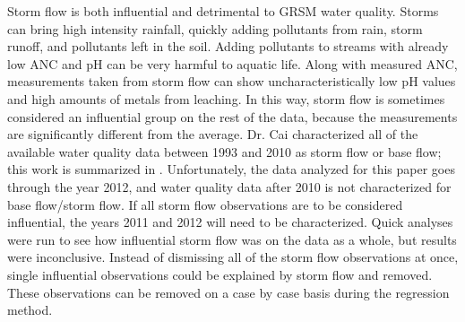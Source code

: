 Storm flow is both influential and detrimental  to GRSM water quality. 
Storms can bring high intensity rainfall, quickly adding pollutants from rain, storm runoff, and pollutants left in the soil.
Adding pollutants to streams with already low ANC and pH can be very harmful to aquatic life.
Along with measured ANC, measurements taken from storm flow can show uncharacteristically low pH values and high amounts of metals from leaching. 
In this way, storm flow is sometimes considered an influential group on the rest of the data, because the measurements are significantly different from the average. 
Dr. Cai characterized all of the available water quality data between 1993 and 2010 as storm flow or base flow; this work is summarized in \citet{cai2013}. 
Unfortunately, the data analyzed for this paper goes through the year 2012, and water quality data after 2010 is not characterized for base flow/storm flow. 
If all storm flow observations are to be considered influential, the years 2011 and 2012 will need to be characterized. 
Quick analyses were run to see how influential storm flow was on the data as a whole, but results were inconclusive. 
Instead of dismissing all of the storm flow observations at once, single influential observations could be explained by storm flow and removed. 
These observations can be removed on a case by case basis during the regression method.

